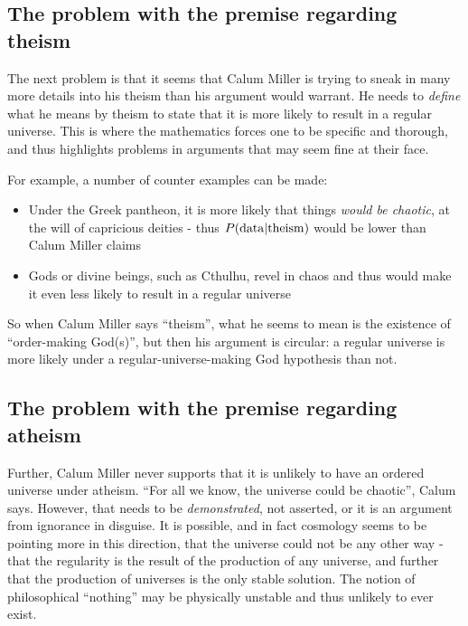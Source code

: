 \subsection{The problem with the premise regarding
theism}\label{the-problem-with-the-premise-regarding-theism}

The next problem is that it seems that Calum Miller is  trying
to sneak in many more details into his theism than his argument would
warrant. He needs to \emph{define} what he means by theism to state that
it is more likely to result in a regular universe. This is where the mathematics forces one to be specific and thorough, and thus highlights problems in arguments that may seem fine at their face.

For example, a number of counter examples can be made:

\begin{itemize}
\item  Under the Greek pantheon, it is more likely that things {\em would be chaotic}, at the will of capricious deities - thus $P({\rm data}|{\rm theism})$ would be lower than Calum Miller claims
\item  Gods or divine beings, such as Cthulhu, revel in chaos and thus would make it even less likely to result in a regular universe
\end{itemize}

So when Calum Miller says ``theism'', what he seems to mean is the existence of ``order-making God(s)'', but then his argument is circular: a regular universe is more likely under a regular-universe-making God hypothesis than not.

\subsection{The problem with the premise regarding
atheism}\label{the-problem-with-the-premise-regarding-atheism}

Further, Calum Miller never supports that it is unlikely to have an ordered universe under atheism. ``For all
we know, the universe could be chaotic'', Calum says. However, that
needs to be \emph{demonstrated}, not asserted, or it is an argument from
ignorance in disguise. It is possible, and in fact cosmology seems to be
pointing more in this direction, that the universe could not be any
other way - that the regularity is the result of the production of any
universe, and further that the production of universes is the only
stable solution. The notion of philosophical ``nothing'' may be
physically unstable and thus unlikely to ever exist.


